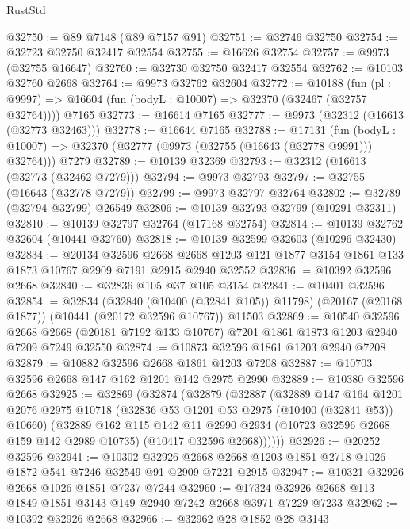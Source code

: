\begin{lexlean}{RustStd}
\begin{coremodule}
@32750 := @89 @7148 (@89 @7157 @91)
@32751 := @32746 @32750
@32754 := @32723 @32750 @32417 @32554
@32755 := @16626 @32754
@32757 := @9973 (@32755 @16647)
@32760 := @32730 @32750 @32417 @32554
@32762 := @10103 @32760 @2668
@32764 := @9973 @32762 @32604
@32772 := @10188
    (fun (pl : @9997) => @16604 (fun (bodyL : @10007) => @32370 (@32467 (@32757 @32764))))
    @7165
@32773 := @16614 @7165
@32777 := @9973 (@32312 (@16613 (@32773 @32463)))
@32778 := @16644 @7165
@32788 := @17131
    (fun (bodyL : @10007) => @32370 (@32777 (@9973 (@32755 (@16643 (@32778 @9991))) @32764)))
    @7279
@32789 := @10139 @32369
@32793 := @32312 (@16613 (@32773 (@32462 @7279)))
@32794 := @9973 @32793
@32797 := @32755 (@16643 (@32778 @7279))
@32799 := @9973 @32797 @32764
@32802 := @32789 (@32794 @32799) @26549
@32806 := @10139 @32793 @32799 (@10291 @32311)
@32810 := @10139 @32797 @32764 (@17168 @32754)
@32814 := @10139 @32762 @32604 (@10441 @32760)
@32818 := @10139 @32599 @32603 (@10296 @32430)
@32834 := @20134
    @32596
    @2668
    @2668
    @1203
    @121
    @1877
    @3154
    @1861
    @133
    @1873
    @10767
    @2909
    @7191
    @2915
    @2940
    @32552
@32836 := @10392 @32596 @2668
@32840 := @32836 @105 @37 @105 @3154
@32841 := @10401 @32596
@32854 := @32834
    (@32840 (@10400 (@32841 @105)) @11798)
    (@20167 (@20168 @1877))
    (@10441 (@20172 @32596 @10767))
    @11503
@32869 := @10540
    @32596
    @2668
    @2668
    (@20181 @7192 @133 @10767)
    @7201
    @1861
    @1873
    @1203
    @2940
    @7209
    @7249
    @32550
@32874 := @10873 @32596 @1861 @1203 @2940 @7208
@32879 := @10882 @32596 @2668 @1861 @1203 @7208
@32887 := @10703 @32596 @2668 @147 @162 @1201 @142 @2975 @2990
@32889 := @10380 @32596 @2668
@32925 := @32869
    (@32874
      (@32879
        (@32887
          (@32889
            @147
            @164
            @1201
            @2076
            @2975
            @10718
            (@32836 @53 @1201 @53 @2975 (@10400 (@32841 @53)) @10660)
            (@32889
              @162
              @115
              @142
              @11
              @2990
              @2934
              (@10723 @32596 @2668 @159 @142 @2989 @10735)
              (@10417 @32596 @2668))))))
@32926 := @20252 @32596
@32941 := @10302
    @32926
    @2668
    @2668
    @1203
    @1851
    @2718
    @1026
    @1872
    @541
    @7246
    @32549
    @91
    @2909
    @7221
    @2915
@32947 := @10321 @32926 @2668 @1026 @1851 @7237 @7244
@32960 := @17324 @32926 @2668 @113 @1849 @1851 @3143 @149 @2940 @7242 @2668 @3971 @7229 @7233
@32962 := @10392 @32926 @2668
@32966 := @32962 @28 @1852 @28 @3143

\end{coremodule}
\end{lexlean}
